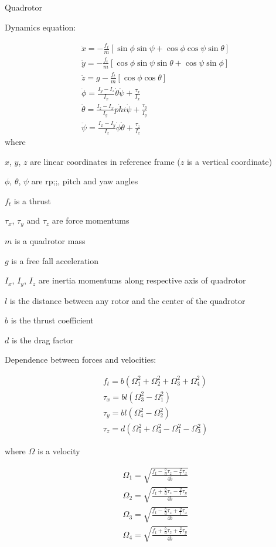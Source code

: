 \documentclass{article}
\begin{document}
\begin{center}
	Quadrotor
\end{center}


Dynamics equation:

\begin{eqnarray}
	& \ddot{x} = -\frac{f_t}{m}[\sin \phi \sin \psi + \cos \phi \cos \psi \sin \theta] \\
	& \ddot{y} = -\frac{f_t}{m}[\cos \phi \sin \psi \sin \theta + \cos \psi \sin \phi] \\
	& \ddot{z} = g - \frac{f_t}{m}[\cos \phi \cos \theta]\\
	& \ddot{\phi} = \frac{I_y-I_z}{I_x}\dot{\theta}\dot{\psi} + \frac{\tau_x}{I_x}\\
	& \ddot{\theta} = \frac{I_z-I_x}{I_y}\dot{phi}\dot{\psi} + \frac{\tau_y}{I_y}\\
	& \ddot{\psi} = \frac{I_x-I_y}{I_z}\dot{\phi}\dot{\theta} + \frac{\tau_z}{I_z}
\end{eqnarray}
where 

$x$, $y$, $z$ are linear coordinates in reference frame ($z$ is a vertical coordinate)

$\phi$, $\theta$, $\psi$ are rp;;, pitch and yaw angles

$f_t$ is a thrust

$\tau_x$, $\tau_y$ and $\tau_z$ are force momentums

$m$ is a quadrotor mass

$g$ is a free fall  acceleration

$I_x$, $I_y$, $I_z$ are inertia momentums along respective axis of quadrotor

$l$ is the distance between any rotor and the center of the quadrotor

$b$ is the thrust coefficient

$d$ is the drag factor


Dependence between forces and velocities:

\begin{eqnarray}
	& f_t = b(\Omega_1^2 + \Omega_2^2 + \Omega_3^2 + \Omega_4^2) \\
	& \tau_x = bl(\Omega_3^2 - \Omega_1^2) \\
	& \tau_y = bl(\Omega_4^2 - \Omega_2^2) \\
	& \tau_z = d(\Omega_1^2 + \Omega_4^2 - \Omega_1^2 - \Omega_3^2)
\end{eqnarray}

where $\Omega$ is a velocity

\begin{eqnarray}
	& \Omega_1 = \sqrt{\frac{f_t - \frac{b}{d}\tau_z-\frac{2}{l}\tau_x}{4b}} \\
	& \Omega_2 = \sqrt{\frac{f_t + \frac{b}{d}\tau_z-\frac{2}{l}\tau_y}{4b}}  \\
	& \Omega_3 = \sqrt{\frac{f_t - \frac{b}{d}\tau_z +\frac{2}{l}\tau_x}{4b}}  \\
	& \Omega_4 = \sqrt{\frac{f_t + \frac{b}{d}\tau_z +\frac{2}{l}\tau_y}{4b}} 
\end{eqnarray}

	
\end{document}
